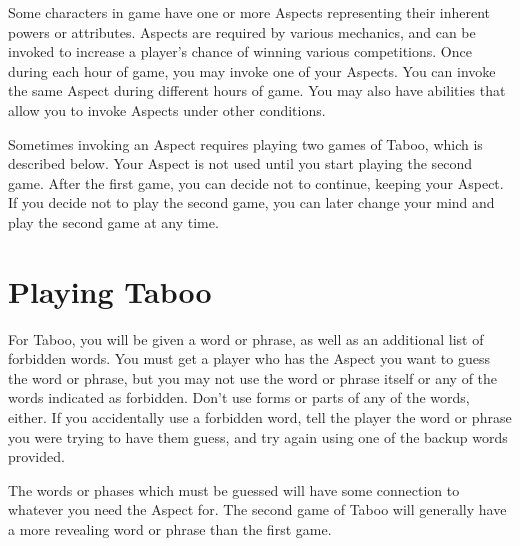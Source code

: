 \documentclass[green]{guardians}
\begin{document}
\name{\gAspect{}}

Some characters in game have one or more Aspects representing their inherent powers or attributes. Aspects are required by various mechanics, and can be invoked to increase a player's chance of winning various competitions. Once during each hour of game, you may invoke one of your Aspects. You can invoke the same Aspect during different hours of game. You may also have abilities that allow you to invoke Aspects under other conditions.

Sometimes invoking an Aspect requires playing two games of Taboo, which is described below. Your Aspect is not used until you start playing the second game. After the first game, you can decide not to continue, keeping your Aspect. If you decide not to play the second game, you can later change your mind and play the second game at any time.


\section*{Playing Taboo}

For Taboo, you will be given a word or phrase, as well as an additional list of forbidden words. You must get a player who has the Aspect you want to guess the word or phrase, but you may not use the word or phrase itself or any of the words indicated as forbidden. Don't use forms or parts of any of the words, either. If you accidentally use a forbidden word, tell the player the word or phrase you were trying to have them guess, and try again using one of the backup words provided.

The words or phases which must be guessed will have some connection to whatever you need the Aspect for. The second game of Taboo will generally have a more revealing word or phrase than the first game.
\end{document}
